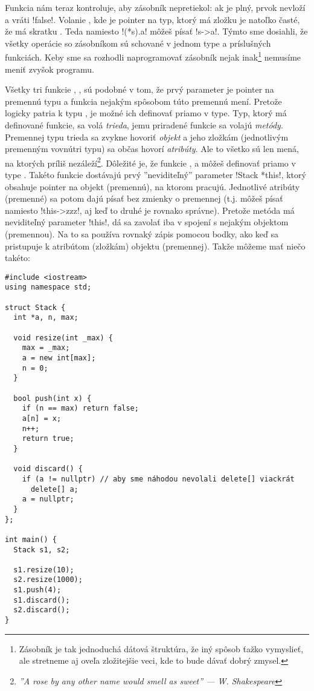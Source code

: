  Funkcia  nám teraz kontroluje, aby zásobník nepretiekol: ak je plný, 
prvok nevloží a vráti \prg!false!.
Volanie , kde  je pointer na typ, ktorý má zložku  je natoľko%
časté, že má skratku . Teda namiesto \prg!(*s).a! môžeš písať \prg!s->a!.
Týmto sme dosiahli, že všetky operácie so zásobníkom sú schované v jednom type a príslušných
funkciách. Keby sme sa rozhodli naprogramovať zásobník nejak inak\footnote{%
  Zásobník je tak jednoduchá dátová štruktúra, že iný spôsob ťažko vymyslieť, ale 
  stretneme aj oveľa zložitejšie veci, kde to bude dávať dobrý zmysel.}
nemusíme meniť zvyšok programu. 



Všetky tri funkcie , ,  sú podobné v tom, že prvý
parameter je pointer na premennú typu  a funkcia nejakým spôsobom túto premennú 
mení. Pretože logicky patria k typu , je možné ich definovať priamo v type.
Typ, ktorý má definované funkcie, sa volá {\em trieda}, jemu priradené funkcie sa volajú
{\em metódy}. Premennej typu trieda sa zvykne hovoriť {\em objekt} a jeho zložkám 
(jednotlivým premenným vovnútri typu) sa občas hovorí {\em atribúty}. Ale to všetko sú
len mená, na ktorých príliš nezáleží\footnote{{\em ''A rose by any other name would 
smell as sweet'' --- W. Shakespeare}}. Dôležité je, že funkcie , 
a  môžeš definovať priamo v type . Takéto funkcie
dostávajú prvý ''neviditeľný'' parameter \prg!Stack *this!, ktorý obsahuje pointer
na objekt (premennú), na ktorom pracujú. Jednotlivé atribúty (premenné) sa potom
dajú písať bez zmienky o premennej (t.j. môžeš písať  namiesto \prg!this->zzz!, 
aj keď to druhé je rovnako správne). Pretože metóda má neviditeľný parameter \prg!this!,
dá sa zavolať iba v spojení s nejakým objektom (premennou).  Na to sa používa rovnaký zápis
pomocou bodky, ako keď sa pristupuje k atribútom (zložkám) objektu (premennej). 
Takže môžeme mať niečo takéto:

\begin{lstlisting}[] 
#include <iostream>
using namespace std;

struct Stack {
  int *a, n, max;

  void resize(int _max) {
    max = _max;
    a = new int[max];
    n = 0;
  }

  bool push(int x) {
    if (n == max) return false;
    a[n] = x;
    n++;
    return true;
  }

  void discard() {
    if (a != nullptr) // aby sme náhodou nevolali delete[] viackrát
      delete[] a;
    a = nullptr;
  }
};

int main() {
  Stack s1, s2;

  s1.resize(10);
  s2.resize(1000);
  s1.push(4);
  s1.discard();
  s2.discard();
}
\end{lstlisting}

